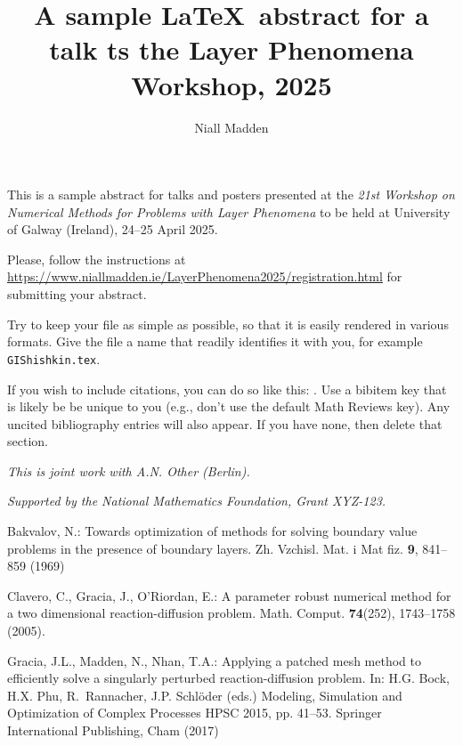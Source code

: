 \documentclass[a4paper]{amsart}
\date{}
\begin{document}
\title{A sample \LaTeX\ abstract for a talk ts the Layer Phenomena
  Workshop, 2025}
\author{Niall Madden} %
\address{University of Wherever} %

\maketitle


This is a sample abstract for talks and posters
presented at the \emph{21st Workshop on Numerical Methods for Problems
  with Layer Phenomena} to be held at University of Galway (Ireland),
24--25 April 2025.

Please, follow the instructions at
\url{https://www.niallmadden.ie/LayerPhenomena2025/registration.html} 
for submitting your abstract. 

Try to keep your file as simple as possible, so that it is easily
rendered in various formats. Give the file a name that readily
identifies it with you, for example \texttt{GIShishkin.tex}. 

If you wish to include citations, you can do so like this:
\cite{My-key-for-Bakhvalov69}. Use a bibitem key that is likely be be unique to
you (e.g., don't use the default Math Reviews key).
Any uncited bibliography entries will also
appear. If you have none, then delete that section.

\emph{This is joint work with A.N. Other (Berlin).}

\emph{Supported by the National Mathematics Foundation, Grant XYZ-123.}

\begin{thebibliography}{1}

Bakvalov, N.: Towards optimization of methods for solving boundary value
  problems in the presence of boundary layers.
\newblock Zh. Vzchisl. Mat. i Mat fiz. \textbf{9}, 841--859 (1969)

Clavero, C., Gracia, J., O'Riordan, E.: {A parameter robust numerical method
  for a two dimensional reaction-diffusion problem.}
\newblock Math. Comput. \textbf{74}(252), 1743--1758 (2005).
\newblock {}


Gracia, J.L., Madden, N., Nhan, T.A.: Applying a patched mesh method to
  efficiently solve a singularly perturbed reaction-diffusion problem.
\newblock In: H.G. Bock, H.X. Phu, R.~Rannacher, J.P. Schl{\"o}der (eds.)
  Modeling, Simulation and Optimization of Complex Processes HPSC 2015, pp.
  41--53. Springer International Publishing, Cham (2017)

\end{thebibliography}
\end{document}
